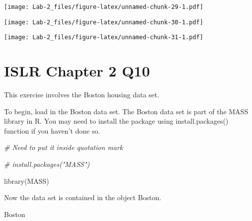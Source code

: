 \documentclass[
]{article}
\newenvironment{Shaded}{\begin{snugshade}}{\end{snugshade}}
\newcommand{\AttributeTok}[1]{\textcolor[rgb]{0.77,0.63,0.00}{#1}}
\newcommand{\CommentTok}[1]{\textcolor[rgb]{0.56,0.35,0.01}{\textit{#1}}}
\newcommand{\FunctionTok}[1]{\textcolor[rgb]{0.00,0.00,0.00}{#1}}
\newcommand{\NormalTok}[1]{#1}
\newcommand{\SpecialCharTok}[1]{\textcolor[rgb]{0.00,0.00,0.00}{#1}}
\begin{document}
\texttt{[image: Lab-2\_files/figure-latex/unnamed-chunk-29-1.pdf]}

\begin{Shaded}
\end{Shaded}

\texttt{[image: Lab-2\_files/figure-latex/unnamed-chunk-30-1.pdf]}

\begin{Shaded}
\end{Shaded}

\texttt{[image: Lab-2\_files/figure-latex/unnamed-chunk-31-1.pdf]}

\hypertarget{islr-chapter-2-q10}{%
\section{ISLR Chapter 2 Q10}\label{islr-chapter-2-q10}}

This exercise involves the Boston housing data set.

To begin, load in the Boston data set. The Boston data set is part of
the MASS library in R. You may need to install the package using
install.packages() function if you haven't done so.

\begin{Shaded}
\begin{Highlighting}[]
\CommentTok{\# Need to put it inside quotation mark}

\CommentTok{\# install.packages("MASS")}

\FunctionTok{library}\NormalTok{(MASS)}
\end{Highlighting}
\end{Shaded}

Now the data set is contained in the object Boston.

\begin{Shaded}
\begin{Highlighting}[]
\NormalTok{Boston}
\end{Highlighting}
\end{Shaded}
\end{document}
